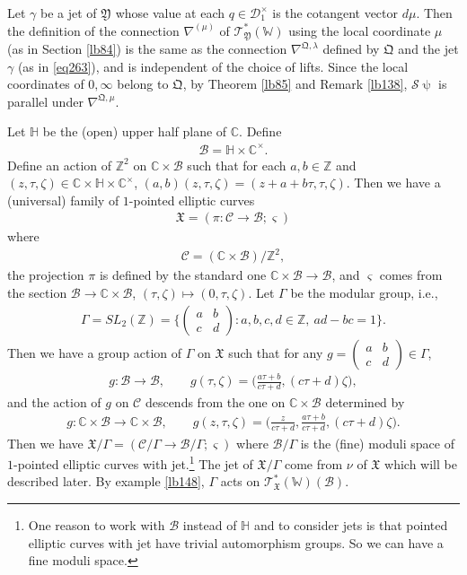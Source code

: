 \documentclass[12pt,b5paper,notitlepage]{report}
\theoremstyle{definition}
\theoremstyle{plain}
\newcommand{\fk}{\mathfrak}
\newcommand{\mc}{\mathcal}
\newcommand{\scr}{\mathscr}
\newcommand{\sgm}{\varsigma}
\newcommand{\mbb}{\mathbb}
\newcommand{\Wbb}{\mathbb W}
\newcommand{\Cbb}{\mathbb C}
\newcommand{\Zbb}{\mathbb Z}
\numberwithin{equation}{section}
\begin{document}
Let $\gamma$ be a jet of $\fk Y$ whose value at each $q\in\mc D_1^\times$ is the cotangent vector $d\mu$. Then the definition of the connection $\nabla^{(\mu)}$ of $\scr T_{\fk Y}^*(\Wbb)$ using the local coordinate $\mu$ (as in Section \ref{lb84})  is the same as the connection $\nabla^{\fk Q,\lambda}$ defined by $\fk Q$ and the jet $\gamma$ (as in \eqref{eq263}), and is independent of the choice of lifts. Since the local coordinates of $0,\infty$ belong to $\fk Q$, by Theorem \ref{lb85} and Remark \ref{lb138}, $\mc S\uppsi$ is parallel under $\nabla^{\fk Q,\mu}$.


Let $\mbb H$ be the (open) upper half plane of $\Cbb$. Define
\begin{align*}
\mc B=\mbb H\times\Cbb^\times.
\end{align*}
Define an action of $\Zbb^2$ on $\Cbb\times\mc B$ such that for each $a,b\in\Zbb$ and $(z,\tau,\zeta)\in\Cbb\times\mbb H\times\Cbb^\times$, $(a,b)(z,\tau,\zeta)=(z+a+b\tau,\tau,\zeta)$. Then we have a (universal) family of $1$-pointed elliptic curves
\begin{align*}
\fk X=(\pi:\mc C\rightarrow\mc B;\sgm)
\end{align*}
where 
\begin{align*}
\mc C=(\Cbb\times\mc B)/\Zbb^2,
\end{align*}
the projection $\pi$ is defined by the standard one $\Cbb\times\mc B\rightarrow\mc B$, and $\sgm$ comes from the section $\mc B\rightarrow\Cbb\times \mc B$, $(\tau,\zeta)\mapsto (0,\tau,\zeta)$. Let $\Gamma$ be the modular group, i.e.,
\begin{align*}
\Gamma=SL_2(\Zbb)=\bigg\{\begin{pmatrix}
a & b\\
c & d
\end{pmatrix}
:a,b,c,d\in\Zbb,~ad-bc=1
\bigg\}.
\end{align*}
Then we have a group action of $\Gamma$ on $\fk X$ such that for any $g=\begin{pmatrix}
a & b\\
c & d
\end{pmatrix}\in \Gamma$, 
\begin{gather*}
g:\mc B\rightarrow\mc B,\qquad g(\tau,\zeta)=\Big(\frac{a\tau+b}{c\tau+d},(c\tau+d)\zeta  \Big),
\end{gather*}
and the action of $g$ on $\mc C$ descends from the one on $\Cbb\times\mc B$ determined by
\begin{gather*}
g:\Cbb\times\mc B\rightarrow \Cbb\times\mc B,\qquad g(z,\tau,\zeta)=\Big(\frac z{c\tau+d},\frac{a\tau+b}{c\tau+d},(c\tau+d)\zeta  \Big).
\end{gather*}
Then we have  $\fk X/\Gamma=(\mc C/\Gamma\rightarrow \mc B/\Gamma;\sgm)$ where $\mc B/\Gamma$ is the (fine) moduli space of $1$-pointed elliptic curves with jet.\footnote{One reason to work with $\mc B$ instead of $\mbb H$ and to consider jets is that pointed elliptic curves with jet have trivial automorphism groups. So we can have a fine moduli space.} The jet of $\fk X/\Gamma$ come from $\nu$ of $\fk X$ which will be described later. By example \ref{lb148}, $\Gamma$ acts on $\scr T_{\fk X}^*(\Wbb)(\mc B)$.
\end{document}
